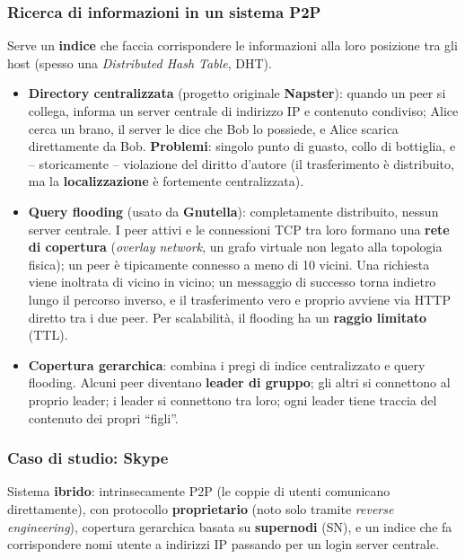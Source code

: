 \documentclass[12pt, a4paper]{article}
\begin{document}
\subsubsection{Ricerca di informazioni in un sistema P2P}

Serve un \textbf{indice} che faccia corrispondere le informazioni alla loro posizione tra gli host (spesso una \textit{Distributed Hash Table}, DHT).

\begin{itemize}
    \item \textbf{Directory centralizzata} (progetto originale \textbf{Napster}): quando un peer si collega, informa un server centrale di indirizzo IP e contenuto condiviso; Alice cerca un brano, il server le dice che Bob lo possiede, e Alice scarica direttamente da Bob. \textbf{Problemi}: singolo punto di guasto, collo di bottiglia, e -- storicamente -- violazione del diritto d'autore (il trasferimento è distribuito, ma la \textbf{localizzazione} è fortemente centralizzata).
    \item \textbf{Query flooding} (usato da \textbf{Gnutella}): completamente distribuito, nessun server centrale. I peer attivi e le connessioni TCP tra loro formano una \textbf{rete di copertura} (\textit{overlay network}, un grafo virtuale non legato alla topologia fisica); un peer è tipicamente connesso a meno di 10 vicini. Una richiesta viene inoltrata di vicino in vicino; un messaggio di successo torna indietro lungo il percorso inverso, e il trasferimento vero e proprio avviene via HTTP diretto tra i due peer. Per scalabilità, il flooding ha un \textbf{raggio limitato} (TTL).
    \item \textbf{Copertura gerarchica}: combina i pregi di indice centralizzato e query flooding. Alcuni peer diventano \textbf{leader di gruppo}; gli altri si connettono al proprio leader; i leader si connettono tra loro; ogni leader tiene traccia del contenuto dei propri ``figli''.
\end{itemize}

\subsubsection{Caso di studio: Skype}

Sistema \textbf{ibrido}: intrinsecamente P2P (le coppie di utenti comunicano direttamente), con protocollo \textbf{proprietario} (noto solo tramite \textit{reverse engineering}), copertura gerarchica basata su \textbf{supernodi} (SN), e un indice che fa corrispondere nomi utente a indirizzi IP passando per un login server centrale.
\end{document}
